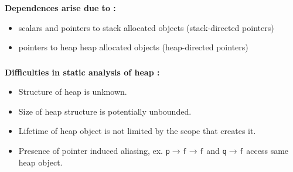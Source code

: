 \documentclass{beamer}
\newcommand{\ttf}[1]{{\tt #1}}
\newcommand{\rtarrow}{$\rightarrow$}
\begin{document}
\frame
{
	\frametitle{\subsecname}
	\textbf{Dependences arise due to :}
	\begin{itemize}
	\item scalars and pointers to stack allocated objects (stack-directed pointers) \\
	\item pointers to heap heap allocated objects (heap-directed pointers)\\
	\end{itemize}
	\begin{figure}
	\begin{center}
%	
	\end{center}
	\end{figure}
	
}

\frame
{
	\frametitle{\subsecname}

	\textbf{Difficulties in static analysis of heap :}
	
	\begin{itemize}
	\item Structure of heap is unknown.
	\item Size of heap structure is potentially unbounded.
	\item Lifetime of heap object is not limited by the scope that creates it.
	\item Presence of pointer induced aliasing, ex. \ttf{p\rtarrow{f}\rtarrow{f}} and \ttf{q\rtarrow{f}} access same heap object.
	\end{itemize}
}
\end{document}
